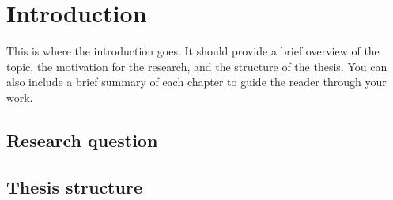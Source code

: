 \chapter{Introduction} \label{sec:introduction}

This is where the introduction goes. It should provide a brief overview of the topic, the motivation for the research,
and the structure of the thesis. You can also include a brief summary of each chapter to guide the reader through your
work.

\section{Research question}

\section{Thesis structure}
